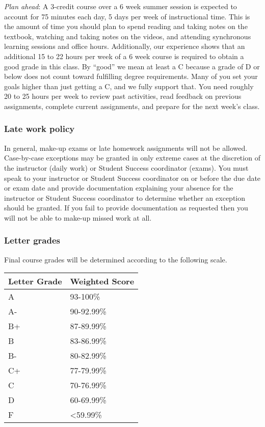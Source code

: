 \documentclass[
]{article}
\begin{document}
\emph{Plan ahead}: A 3-credit course over a 6 week summer session is
expected to account for 75 minutes each day, 5 days per week of
instructional time. This is the amount of time you should plan to spend
reading and taking notes on the textbook, watching and taking notes on
the videos, and attending synchronous learning sessions and office
hours. Additionally, our experience shows that an additional 15 to 22
hours per week of a 6 week course is required to obtain a good grade in
this class. By ``good'' we mean at least a C because a grade of D or
below does not count toward fulfilling degree requirements. Many of you
set your goals higher than just getting a C, and we fully support that.
You need roughly 20 to 25 hours per week to review past activities, read
feedback on previous assignments, complete current assignments, and
prepare for the next week's class.

\subsubsection{Late work policy}\label{late-work-policy}

In general, make-up exams or late homework assignments will not be
allowed. Case-by-case exceptions may be granted in only extreme cases at
the discretion of the instructor (daily work) or Student Success
coordinator (exams). You must speak to your instructor or Student
Success coordinator on or before the due date or exam date and provide
documentation explaining your absence for the instructor or Student
Success coordinator to determine whether an exception should be granted.
If you fail to provide documentation as requested then you will not be
able to make-up missed work at all.

\subsubsection{Letter grades}\label{letter-grades}

Final course grades will be determined according to the following scale.

\begin{longtable}[]{@{}ll@{}}
\toprule\noalign{}
Letter Grade & Weighted Score \\
\midrule\noalign{}
\endhead
\bottomrule\noalign{}
\endlastfoot
A & 93-100\% \\
A- & 90-92.99\% \\
B+ & 87-89.99\% \\
B & 83-86.99\% \\
B- & 80-82.99\% \\
C+ & 77-79.99\% \\
C & 70-76.99\% \\
D & 60-69.99\% \\
F & \textless59.99\% \\
\end{longtable}
\end{document}
